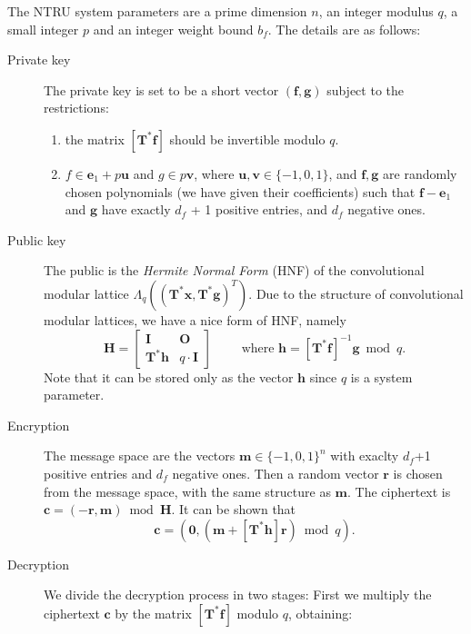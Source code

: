 \documentclass[11pt]{article}
\begin{document}
The NTRU system parameters are a prime dimension $n$, an integer modulus $q$, a small integer $p$ and an integer weight bound $b_f$. The details are as follows:
\begin{description}
  \item[Private key] The private key is set to be a short vector $(\boldsymbol{f}, \boldsymbol{g})$ subject to the restrictions:
    \begin{enumerate}
      \item the matrix $[\boldsymbol{T^*f}]$ should be invertible modulo $q$.
      \item $f \in \boldsymbol{e}_1 + p\boldsymbol{u}$ and $g \in p \boldsymbol{v}$, where $\boldsymbol{u}, \boldsymbol{v} \in \{ -1, 0, 1 \}$, and $\boldsymbol{f}, \boldsymbol{g}$ are randomly chosen polynomials (we have given their coefficients) such that $\boldsymbol{f} - \boldsymbol{e}_1$ and $\boldsymbol{g}$ have exactly $d_f$ + 1 positive entries, and $d_f$ negative ones.
    \end{enumerate}
  \item[Public key] The public is the \emph{Hermite Normal Form} (HNF) of the convolutional modular lattice $\Lambda_q((\boldsymbol{T^*x}, \boldsymbol{T^*g})^T)$. Due to the structure of convolutional modular lattices, we have a nice form of HNF, namely
\begin{equation*}
  \boldsymbol{H}=
  \begin{bmatrix}
    \boldsymbol{I} & \boldsymbol{O} \\
    \boldsymbol{T^*h} & q \cdot \boldsymbol{I}
  \end{bmatrix}
 \qquad \text{ where } \boldsymbol{h} = [\boldsymbol{T^*f}]^{-1}\boldsymbol{g} \bmod q.
\end{equation*}
Note that it can be stored only as the vector $\boldsymbol{h}$ since $q$ is a system parameter.
\item[Encryption] The message space are the vectors $\boldsymbol{m} \in \{ -1,0,1 \} ^n$ with exaclty $d_f$+1 positive entries and $d_f$ negative ones. Then a random vector $\boldsymbol{r}$ is chosen from the message space, with the same structure as $\boldsymbol{m}$. The ciphertext is $\boldsymbol{c}  = (-\boldsymbol{r}, \boldsymbol{m}) \bmod \boldsymbol{H}$. It can be shown that
\begin{equation}
  \boldsymbol{c} = (\boldsymbol{0}, (\boldsymbol{m}+ [\boldsymbol{T^*h}]\boldsymbol{r}) \bmod q ).
\end{equation}
\item[Decryption] We divide the decryption process in two stages: First we multiply the ciphertext $\boldsymbol{c}$ by the matrix $[\boldsymbol{T^*f}]$ modulo $q$, obtaining:

\end{description}
\end{document}
